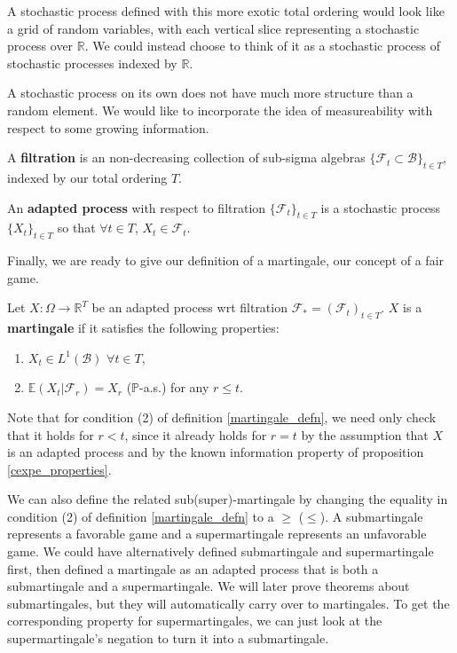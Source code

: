 A stochastic process defined with this more exotic total ordering would look like a grid of random variables, with each vertical slice representing a stochastic process over \(\mathbb{R}\). We could instead choose to think of it as a stochastic process of stochastic processes indexed by \(\mathbb{R}\).

A stochastic process on its own does not have much more structure than a random element. We would like to incorporate the idea of measureability with respect to some growing information.

\begin{definition}
    A \textbf{filtration} is an non-decreasing collection of sub-sigma algebras \(\{\mathcal{F}_{t} \subset \mathcal{B}\}_{t \in T}\), indexed by our total ordering \(T\).
\end{definition}

\begin{definition}
    An \textbf{adapted process} with respect to filtration \(\{\mathcal{F}_{t}\}_{t \in T}\) is a stochastic process \(\{X_{t}\}_{t \in T}\) so that \(\forall t \in T\), \(X_{t} \in \mathcal{F}_{t}\).
\end{definition}

Finally, we are ready to give our definition of a martingale, our concept of a fair game.

\begin{definition}
    \label{martingale_defn}
    Let $X: \Omega \to \mathbb{R}^{T}$ be an adapted process wrt filtration $\mathcal{F}_{*} = (\mathcal{F}_{t})_{t \in T}$. $X$ is a \textbf{martingale} if it satisfies the following properties:
    \begin{enumerate}
        \item $X_{t} \in L^{1}(\mathcal{B})$ $\forall t \in T$,
        \item $\mathbb{E}(X_{t} | \mathcal{F}_{r}) = X_{r}$ (\(\mathbb{P}\)-a.s.) for any $r \leq t$.
    \end{enumerate}
\end{definition}

Note that for condition (2) of definition \ref{martingale_defn}, we need only check that it holds for \(r < t\), since it already holds for \(r = t\) by the assumption that \(X\) is an adapted process and by the known information property of proposition \ref{cexpe_properties}.

We can also define the related sub(super)-martingale by changing the equality in condition (2) of definition \ref{martingale_defn} to a \(\geq\) (\(\leq\)). A submartingale represents a favorable game and a supermartingale represents an unfavorable game. We could have alternatively defined submartingale and supermartingale first, then defined a martingale as an adapted process that is both a submartingale and a supermartingale. We will later prove theorems about submartingales, but they will automatically carry over to martingales. To get the corresponding property for supermartingales, we can just look at the supermartingale's negation to turn it into a submartingale.

